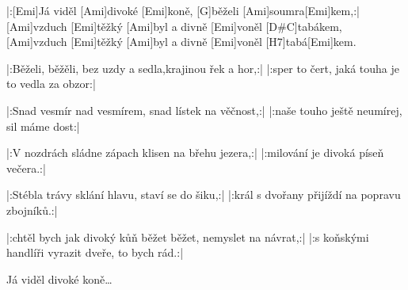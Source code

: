 
\sloka
|:[Emi]Já viděl [Ami]divoké [Emi]koně, [G]běželi [Ami]soumra[Emi]kem,:|
[Ami]vzduch [Emi]těžký [Ami]byl a divně [Emi]voněl [D#\dim C]tabákem,
[Ami]vzduch [Emi]těžký [Ami]byl a divně [Emi]voněl [H7]tabá[Emi]kem.

\sloka
|:Běželi, běžěli, bez uzdy a sedla,krajinou řek a hor,:|
|:sper to čert, jaká touha je to vedla za obzor:|

\sloka
|:Snad vesmír nad vesmírem, snad lístek na věčnost,:|
|:naše touho ještě neumírej, sil máme dost:|

\sloka
|:V nozdrách sládne zápach klisen na břehu jezera,:|
|:milování je divoká píseň večera.:|

\sloka
|:Stébla trávy sklání hlavu, staví se do šiku,:|
|:král s dvořany přijíždí na popravu zbojníků.:|

\sloka
|:chtěl bych jak divoký kůň běžet běžet, nemyslet na návrat,:|
|:s koňskými handlíři vyrazit dveře, to bych rád.:|

\napis{}
Já viděl divoké koně… 

